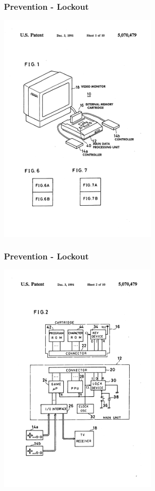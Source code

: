 \documentclass{beamer}
\begin{document}
\begin{frame}
	\frametitle{Prevention - Lockout}

	\begin{center}
	\includegraphics[width=0.6\textwidth]{US5070479-drawings-page-2.png}
	\end{center}
\end{frame}

\begin{frame}
	\frametitle{Prevention - Lockout}

	\begin{center}
	\includegraphics[width=0.6\textwidth]{US5070479-drawings-page-3.png}
	\end{center}
\end{frame}
\end{document}
